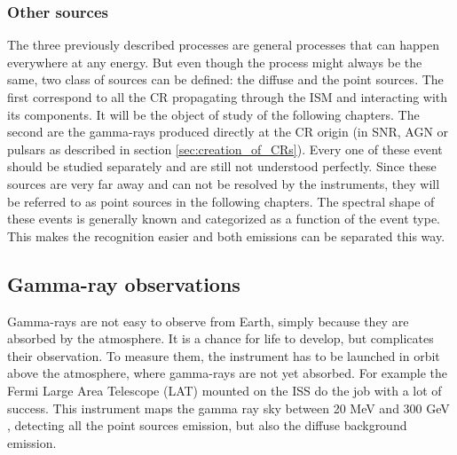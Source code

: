 \subsubsection{Other sources}

The three previously described processes are general processes that can happen everywhere at any energy. But even though the process might always be the same, two class of sources can be defined: the diffuse and the point sources. 
The first correspond to all the CR propagating through the ISM and interacting with its components. It will be the object of study of the following chapters. 
The second are the gamma-rays produced directly at the CR origin (in SNR, AGN or pulsars as described in section \ref{sec:creation_of_CRs}). Every one of these event should be studied separately and are still not understood perfectly. Since these sources are very far away and can not be resolved by the instruments, they will be referred to as point sources in the following chapters. The spectral shape of these events is generally known and categorized as a function of the event type. This makes the recognition easier and both emissions can be separated 
this way.




\subsection{Gamma-ray observations}

Gamma-rays are not easy to observe from Earth, simply because they are absorbed by the atmosphere. It is a chance for life to develop, but complicates their observation. To measure them, the instrument has to be launched in orbit above the atmosphere, where gamma-rays are not yet absorbed. For example the Fermi Large Area Telescope (LAT) mounted on the ISS do the job with a lot of success. This instrument maps the gamma ray sky between 20 MeV and 300 GeV , detecting all the point sources emission, but also the diffuse background emission.


